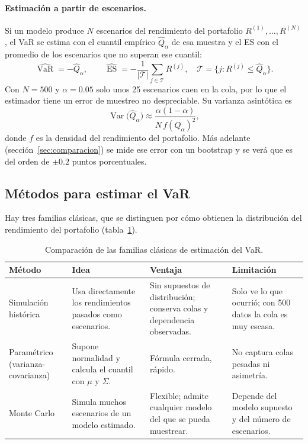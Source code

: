 \documentclass[12pt,letterpaper]{article}
\newcommand{\VaR}{\operatorname{VaR}}
\newcommand{\ES}{\operatorname{ES}}
\begin{document}
\paragraph{Estimación a partir de escenarios.}
Si un modelo produce $N$ escenarios del rendimiento del portafolio $R^{(1)},\dots,R^{(N)}$, el VaR se estima con el cuantil empírico $\hat Q_\alpha$ de esa muestra y el ES con el promedio de los escenarios que no superan ese cuantil:
\begin{equation}
  \widehat{\VaR} = -\hat Q_\alpha, \qquad
  \widehat{\ES} = -\frac{1}{|\mathcal T|}\sum_{j\in\mathcal T} R^{(j)},\quad \mathcal T=\{j: R^{(j)}\le \hat Q_\alpha\}.
\end{equation}
Con $N=500$ y $\alpha=0.05$ solo unos 25 escenarios caen en la cola, por lo que el estimador tiene un error de muestreo no despreciable. Su varianza asintótica es \cite{jorion2007}
\begin{equation}\label{eq:varcuantil}
  \operatorname{Var}\big(\hat Q_\alpha\big) \approx \frac{\alpha(1-\alpha)}{N\,f(Q_\alpha)^2},
\end{equation}
donde $f$ es la densidad del rendimiento del portafolio. Más adelante (sección~\ref{sec:comparacion}) se mide ese error con un bootstrap y se verá que es del orden de $\pm 0.2$ puntos porcentuales.

\subsection{Métodos para estimar el VaR}

Hay tres familias clásicas, que se distinguen por cómo obtienen la distribución del rendimiento del portafolio (tabla~\ref{tab:metodos}).

\begin{table}[H]
\centering
\small
\renewcommand{\arraystretch}{1.25}
\begin{tabular}{@{}p{2.9cm}p{4.2cm}p{4.0cm}p{3.6cm}@{}}
\toprule
\textbf{Método} & \textbf{Idea} & \textbf{Ventaja} & \textbf{Limitación}\\
\midrule
Simulación histórica & Usa directamente los rendimientos pasados como escenarios. & Sin supuestos de distribución; conserva colas y dependencia observadas. & Solo ve lo que ocurrió; con 500 datos la cola es muy escasa.\\
Paramétrico (varianza-covarianza) & Supone normalidad y calcula el cuantil con $\mu$ y $\Sigma$. & Fórmula cerrada, rápido. & No captura colas pesadas ni asimetría.\\
Monte Carlo & Simula muchos escenarios de un modelo estimado. & Flexible; admite cualquier modelo del que se pueda muestrear. & Depende del modelo supuesto y del número de escenarios.\\
\bottomrule
\end{tabular}
\caption{Comparación de las familias clásicas de estimación del VaR.}\label{tab:metodos}
\end{table}
\end{document}
